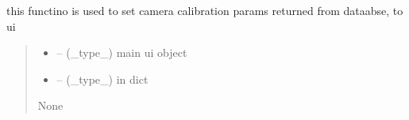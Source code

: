 \documentclass[letterpaper,10pt,english]{sphinxmanual}
\begin{document}
\begin{savenotes}\begin{fulllineitems}
\label{\detokenize{setting/backend/camera_funcs:oxin.backend.camera_funcs.set_camera_calibration_params_to_ui}}
\pysigstartsignatures
{}
\pysigstopsignatures
\sphinxAtStartPar
this functino is used to set camera calibration params returned from dataabse, to ui
\begin{quote}\begin{description}
\begin{itemize}
\item {} 
\sphinxAtStartPar
{} – (\_type\_) main ui object

\item {} 
\sphinxAtStartPar
{} – (\_type\_) in dict

\end{itemize}

\sphinxAtStartPar
None

\end{description}\end{quote}

\end{fulllineitems}\end{savenotes}

\end{document}
